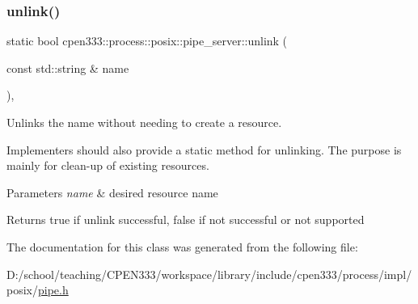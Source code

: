 \subsubsection{\texorpdfstring{unlink()}{unlink()}\hspace{0.1cm}{\footnotesize\ttfamily [2/2]}}
{\footnotesize\ttfamily static bool cpen333\+::process\+::posix\+::pipe\+\_\+server\+::unlink (\begin{DoxyParamCaption}\item[{const std\+::string \&}]{name }\end{DoxyParamCaption})\hspace{0.3cm}{\ttfamily [inline]}, {\ttfamily [static]}}



Unlinks the name without needing to create a resource. 

Implementers should also provide a static method for unlinking. The purpose is mainly for clean-\/up of existing resources.


\begin{DoxyParams}{Parameters}
{\em name} & desired resource name \\
\hline
\end{DoxyParams}
\begin{DoxyReturn}{Returns}
{\ttfamily true} if unlink successful, {\ttfamily false} if not successful or not supported 
\end{DoxyReturn}


The documentation for this class was generated from the following file\+:\begin{DoxyCompactItemize}
\item 
D\+:/school/teaching/\+C\+P\+E\+N333/workspace/library/include/cpen333/process/impl/posix/\hyperlink{impl_2posix_2pipe_8h}{pipe.\+h}\end{DoxyCompactItemize}

